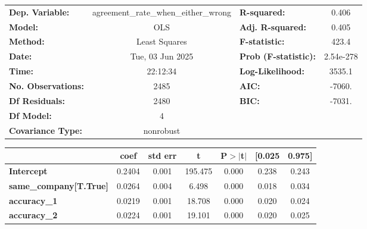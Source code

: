 \begin{center}
\begin{tabular}{lclc}
\toprule
\textbf{Dep. Variable:}          & agreement\_rate\_when\_either\_wrong & \textbf{  R-squared:         } &     0.406   \\
\textbf{Model:}                  &                 OLS                  & \textbf{  Adj. R-squared:    } &     0.405   \\
\textbf{Method:}                 &            Least Squares             & \textbf{  F-statistic:       } &     423.4   \\
\textbf{Date:}                   &           Tue, 03 Jun 2025           & \textbf{  Prob (F-statistic):} & 2.54e-278   \\
\textbf{Time:}                   &               22:12:34               & \textbf{  Log-Likelihood:    } &    3535.1   \\
\textbf{No. Observations:}       &                  2485                & \textbf{  AIC:               } &    -7060.   \\
\textbf{Df Residuals:}           &                  2480                & \textbf{  BIC:               } &    -7031.   \\
\textbf{Df Model:}               &                     4                & \textbf{                     } &             \\
\textbf{Covariance Type:}        &              nonrobust               & \textbf{                     } &             \\
\bottomrule
\end{tabular}
\begin{tabular}{lcccccc}
                                 & \textbf{coef} & \textbf{std err} & \textbf{t} & \textbf{P$> |$t$|$} & \textbf{[0.025} & \textbf{0.975]}  \\
\midrule
\textbf{Intercept}               &       0.2404  &        0.001     &   195.475  &         0.000        &        0.238    &        0.243     \\
\textbf{same\_company[T.True]}   &       0.0264  &        0.004     &     6.498  &         0.000        &        0.018    &        0.034     \\
\textbf{accuracy\_1}             &       0.0219  &        0.001     &    18.708  &         0.000        &        0.020    &        0.024     \\
\textbf{accuracy\_2}             &       0.0224  &        0.001     &    19.101  &         0.000        &        0.020    &        0.025     \\

\end{tabular}
\end{center}
